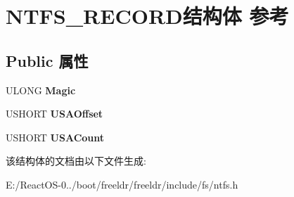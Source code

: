 \hypertarget{struct_n_t_f_s___r_e_c_o_r_d}{}\section{N\+T\+F\+S\+\_\+\+R\+E\+C\+O\+R\+D结构体 参考}
\label{struct_n_t_f_s___r_e_c_o_r_d}
\subsection*{Public 属性}
\begin{DoxyCompactItemize}
\item 
\mbox{\label{struct_n_t_f_s___r_e_c_o_r_d_a299956682db633f8c7012a9d70ddb35d}} 
U\+L\+O\+NG {\bfseries Magic}
\item 
\mbox{\label{struct_n_t_f_s___r_e_c_o_r_d_adcdd162a267c00cef6c4f981f72c3eb9}} 
U\+S\+H\+O\+RT {\bfseries U\+S\+A\+Offset}
\item 
\mbox{\label{struct_n_t_f_s___r_e_c_o_r_d_ad056cfc2e7a05ab388c349243580aa6f}} 
U\+S\+H\+O\+RT {\bfseries U\+S\+A\+Count}
\end{DoxyCompactItemize}


该结构体的文档由以下文件生成\+:\begin{DoxyCompactItemize}
\item 
E\+:/\+React\+O\+S-\/0../boot/freeldr/freeldr/include/fs/ntfs.\+h\end{DoxyCompactItemize}
